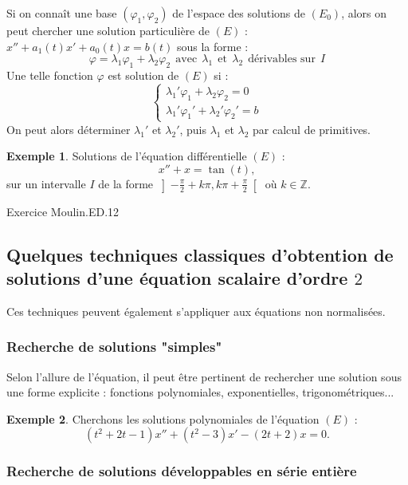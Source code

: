 \documentclass[french]{article}
\newcommand{\Z}{\mathbb{Z}}
\theoremstyle{plain}
\theoremstyle{definition}
\newtheorem*{ex}{Exemple}
\theoremstyle{remark}
\begin{document}
\begin{met}
	Si on connaît une base $(\varphi_1,\varphi_2)$ de l'espace des solutions de $(E_0)$, alors on peut chercher une solution particulière de $(E)$ : $x''+a_1(t)x'+a_0(t)x=b(t)$ sous la forme : $$\varphi =\lambda_1\varphi_1+\lambda_2\varphi_2\ \ \text{avec}\ \ \lambda_1\ \ \text{et}\ \ \lambda_2\ \ \text{dérivables sur} \ \ I$$ Une telle fonction $\varphi$ est solution de $(E)$ si : $$\begin{cases}
		\lambda_1'\varphi_1+\lambda_2\varphi_2=0 \\
		\lambda_1'\varphi_1'+\lambda_2'\varphi_2'=b
	\end{cases}$$ On peut alors déterminer $\lambda_1'$ et $\lambda_2'$, puis $\lambda_1$ et $\lambda_2$ par calcul de primitives.
\end{met}

\begin{ex}
	Solutions de l'équation différentielle $(E)$ :
	$$x''+x=\tan(t),$$
	sur un intervalle $I$ de la forme $\displaystyle\left]-\frac{\pi}{2}+k\pi,k\pi+\frac{\pi}{2}\right[$ où $k\in\Z$.
\end{ex}

Exercice Moulin.ED.12

\subsection{Quelques techniques classiques d'obtention de solutions d'une équation scalaire d'ordre $2$}

Ces techniques peuvent également s'appliquer aux équations non normalisées.

\subsubsection*{Recherche de solutions "simples"}

Selon l'allure de l'équation, il peut être pertinent de rechercher une solution sous une forme explicite : fonctions polynomiales, exponentielles, trigonométriques...

\begin{ex}
	Cherchons les solutions polynomiales de l'équation $(E)$ :
	$$(t^2+2t-1)x''+(t^2-3)x'-(2t+2)x=0.$$
\end{ex}

\subsubsection*{Recherche de solutions développables en série entière}
\end{document}
